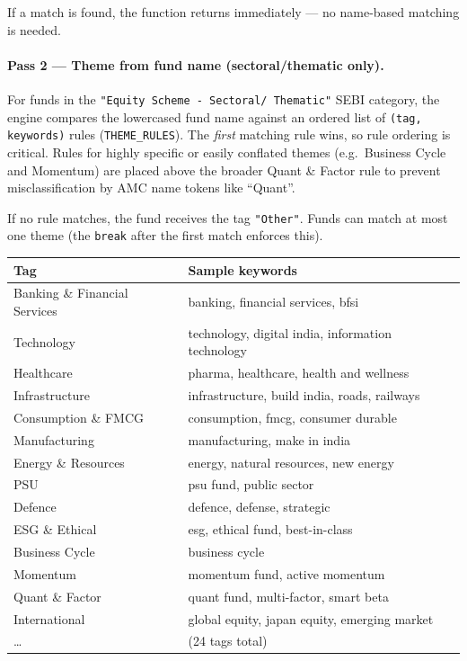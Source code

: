 \documentclass[12pt, a4paper]{article}
\begin{document}
If a match is found, the function returns immediately — no name-based matching
is needed.

\paragraph{Pass 2 — Theme from fund name (sectoral/thematic only).}

For funds in the \texttt{"Equity Scheme - Sectoral/ Thematic"} SEBI category,
the engine compares the lowercased fund name against an ordered list of
\texttt{(tag, keywords)} rules (\texttt{THEME\_RULES}).  The \emph{first}
matching rule wins, so rule ordering is critical.  Rules for highly specific
or easily conflated themes (e.g.\ Business Cycle and Momentum) are placed
above the broader Quant \& Factor rule to prevent misclassification by AMC
name tokens like ``Quant''.

If no rule matches, the fund receives the tag \texttt{"Other"}.  Funds can
match at most one theme (the \texttt{break} after the first match enforces
this).

\begin{center}
\begin{tabular}{@{}lp{}@{}}
\toprule
\textbf{Tag} & \textbf{Sample keywords} \\
\midrule
Banking \& Financial Services & banking, financial services, bfsi \\
Technology & technology, digital india, information technology \\
Healthcare & pharma, healthcare, health and wellness \\
Infrastructure & infrastructure, build india, roads, railways \\
Consumption \& FMCG & consumption, fmcg, consumer durable \\
Manufacturing & manufacturing, make in india \\
Energy \& Resources & energy, natural resources, new energy \\
PSU & psu fund, public sector \\
Defence & defence, defense, strategic \\
ESG \& Ethical & esg, ethical fund, best-in-class \\
Business Cycle & business cycle \\
Momentum & momentum fund, active momentum \\
Quant \& Factor & quant fund, multi-factor, smart beta \\
International & global equity, japan equity, emerging market \\
\ldots & (24 tags total) \\
\bottomrule
\end{tabular}
\end{center}
\end{document}
